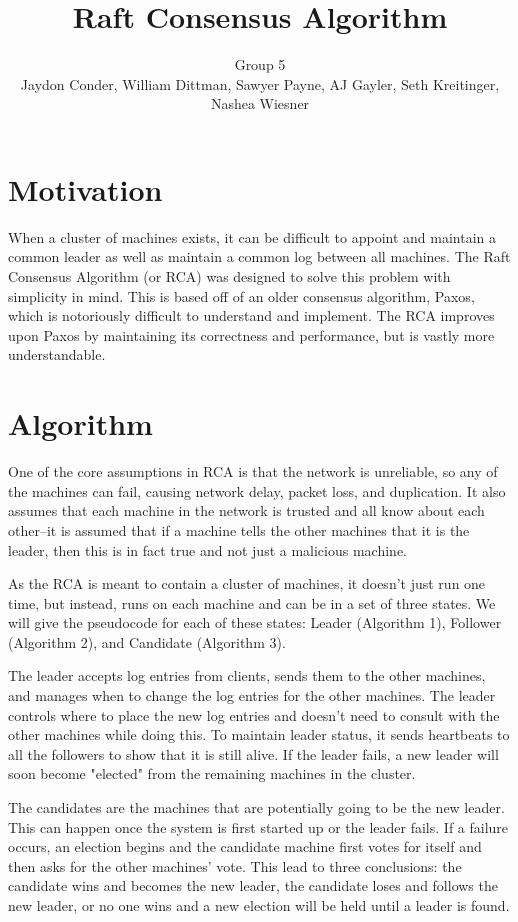 \documentclass[11pt]{article}
\title{Raft Consensus Algorithm}
\author{Group 5 \\ 
\small{Jaydon Conder, William Dittman, Sawyer Payne, AJ Gayler, Seth Kreitinger, Nashea Wiesner}}
\begin{document}
\maketitle

\section{Motivation}
When a cluster of machines exists, it can be difficult to appoint and maintain a common leader as well as maintain a common log between all machines. The Raft Consensus Algorithm (or RCA) was designed to solve this problem with simplicity in mind. This is based off of an older consensus algorithm, Paxos, which is notoriously difficult to understand and implement. The RCA improves upon Paxos by maintaining its correctness and performance, but is vastly more understandable.

\section{Algorithm}
One of the core assumptions in RCA is that the network is unreliable, so any of the machines can fail, causing network delay, packet loss, and duplication. It also assumes that each machine in the network is trusted and all know about each other--it is assumed that if a machine tells the other machines that it is the leader, then this is in fact true and not just a malicious machine.

As the RCA is meant to contain a cluster of machines, it doesn't just run one time, but instead, runs on each machine and can be in a set of three states. We will give the pseudocode for each of these states: Leader (Algorithm 1), Follower (Algorithm 2), and Candidate (Algorithm 3).

The leader accepts log entries from clients, sends them to the other machines, and manages when to change the log entries for the other machines. The leader controls where to place the new log entries and doesn't need to consult with the other machines while doing this. To maintain leader status, it sends heartbeats to all the followers to show that it is still alive. If the leader fails, a new leader will soon become "elected" from the remaining machines in the cluster.  

The candidates are the machines that are potentially going to be the new leader. This can happen once the system is first started up or the leader fails. If a failure occurs, an election begins and the candidate machine first votes for itself and then asks for the other machines' vote. This lead to three conclusions: the candidate wins and becomes the new leader, the candidate loses and follows the new leader, or no one wins and a new election will be held until a leader is found. 
\end{document}
